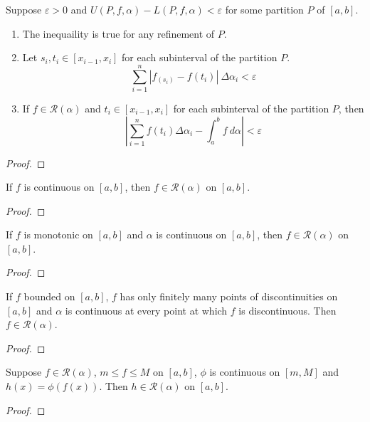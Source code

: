 \begin{theorem}
	Suppose $\varepsilon > 0$ and $U(P,f,\alpha) - L(P,f,\alpha) < \varepsilon$ for some partition $P$ of $[a,b]$.
	\begin{enumerate}
		\item The inequaility is true for any refinement of $P$.
		\item Let $s_i,t_i \in [x_{i-1},x_i]$ for each subinterval of the partition $P$.
			\[ \sum_{i=1}^n \left| f_(s_i)-f(t_i) \right|\ \Delta\alpha_i < \varepsilon \]
		\item If $f \in \mathscr{R}(\alpha)$ and $t_i \in [x_{i-1},x_i]$ for each subinterval of the partition $P$, then
			\[ \left| \sum_{i=1}^n f(t_i) \Delta \alpha_i - \int_a^b f \ d\alpha \right| < \varepsilon \]
	\end{enumerate}
\end{theorem}
\begin{proof}
\end{proof}
\begin{theorem}
	If $f$ is continuous on $[a,b]$, then $f \in \mathscr{R}(\alpha)$ on $[a,b]$.
\end{theorem}
\begin{proof}
\end{proof}

\begin{theorem}
	If $f$ is monotonic on $[a,b]$ and $\alpha$ is continuous on $[a,b]$, then $f \in \mathscr{R}(\alpha)$ on $[a,b]$.
\end{theorem}
\begin{proof}
\end{proof}

\begin{theorem}
	If $f$ bounded on $[a,b]$, $f$ has only finitely many points of discontinuities on $[a,b]$ and $\alpha$ is continuous at every point at which $f$ is discontinuous.
	Then $f \in \mathscr{R}(\alpha)$.
\end{theorem}
\begin{proof}
\end{proof}

\begin{theorem}
	Suppose $f \in \mathscr{R}(\alpha)$, $m \le f \le M$ on $[a,b]$, $\phi$ is continuous on $[m,M]$ and $h(x) = \phi(f(x))$.
	Then $h \in \mathscr{R}(\alpha)$ on $[a,b]$.
\end{theorem}
\begin{proof}
\end{proof}


